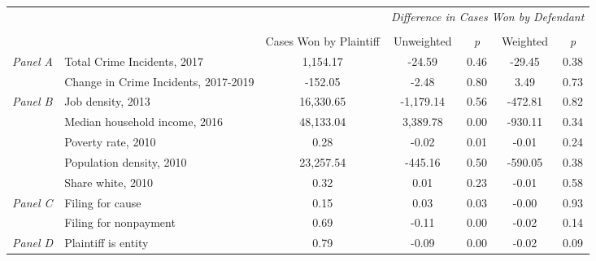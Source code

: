 \begin{tabular}{llccccc}
\toprule
 &  & \textit{} & \multicolumn{4}{c}{\textit{Difference in Cases Won by Defendant}} \\
\cline{4-7}
\\
 &  & Cases Won by Plaintiff & Unweighted & \emph{p} & Weighted & \emph{p} \\
\midrule
\multirow[c]{2}{.75cm}{\textit{Panel A}} & Total Crime Incidents, 2017 & 1,154.17 & -24.59 & 0.46 & -29.45 & 0.38 \\
 & Change in Crime Incidents, 2017-2019 & -152.05 & -2.48 & 0.80 & 3.49 & 0.73 \\
\cline{1-7}
\multirow[c]{5}{.75cm}{\textit{Panel B}} & Job density, 2013 & 16,330.65 & -1,179.14 & 0.56 & -472.81 & 0.82 \\
 & Median household income, 2016 & 48,133.04 & 3,389.78 & 0.00 & -930.11 & 0.34 \\
 & Poverty rate, 2010 & 0.28 & -0.02 & 0.01 & -0.01 & 0.24 \\
 & Population density, 2010 & 23,257.54 & -445.16 & 0.50 & -590.05 & 0.38 \\
 & Share white, 2010 & 0.32 & 0.01 & 0.23 & -0.01 & 0.58 \\
\cline{1-7}
\multirow[c]{2}{.75cm}{\textit{Panel C}} & Filing for cause & 0.15 & 0.03 & 0.03 & -0.00 & 0.93 \\
 & Filing for nonpayment & 0.69 & -0.11 & 0.00 & -0.02 & 0.14 \\
\cline{1-7}
\textit{Panel D} & Plaintiff is entity & 0.79 & -0.09 & 0.00 & -0.02 & 0.09 \\
\cline{1-7}
\bottomrule
\end{tabular}
